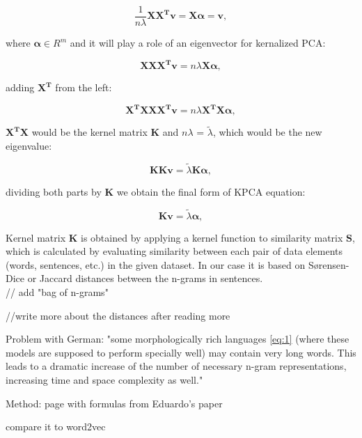 \documentclass[11pt]{report}
\numberwithin{equation}{section} %
\begin{document}
\begin{equation} \label{eq:2}
\frac{1}{n\lambda}\pmb{XX^T}\pmb{v} = \pmb{X\alpha} = \pmb{v},
\end{equation}

where $\pmb{\alpha} \in R^m$ and it will play a role of an eigenvector for kernalized PCA:

\begin{equation} \label{eq:3}
\pmb{XXX^T}\pmb{v} = n\lambda \pmb{X\alpha},
\end{equation}

adding $\pmb{X^T}$ from the left:

\begin{equation} \label{eq:4}
\pmb{X^TXXX^T}\pmb{v} = n\lambda \pmb{X^TX\alpha},
\end{equation}

$ \pmb{X^TX}$ would be the kernel matrix $\pmb{K}$ and $n\lambda$ = $\widetilde{\lambda}$, which would be the new eigenvalue:

\begin{equation} \label{eq:5}
\pmb{KK}\pmb{v} = \widetilde{\lambda} \pmb{K\alpha},
\end{equation}

dividing both parts by $\pmb{K}$ we obtain the final form of KPCA equation:

\begin{equation} \label{eq:6}
\pmb{K}\pmb{v} = \widetilde{\lambda} \pmb{\alpha},
\end{equation}

Kernel matrix $\pmb{K}$ is obtained by applying a kernel function to similarity matrix $\pmb{S}$, which is calculated by evaluating similarity between each pair of data elements (words, sentences, etc.) in the given dataset. In our case it is based on  S{\o}rensen-Dice or Jaccard distances between the n-grams in sentences.\\

// add "bag of n-grams"

//write more about the distances after reading more

Problem with German: "some morphologically rich languages \ref{eq:1}
(where these models are supposed to perform specially well) may contain very
long words. This leads to a dramatic increase of the number of necessary n-gram
representations, increasing time and space complexity as well."


Method: page with formulas from Eduardo's paper

compare it to word2vec
\end{document}

